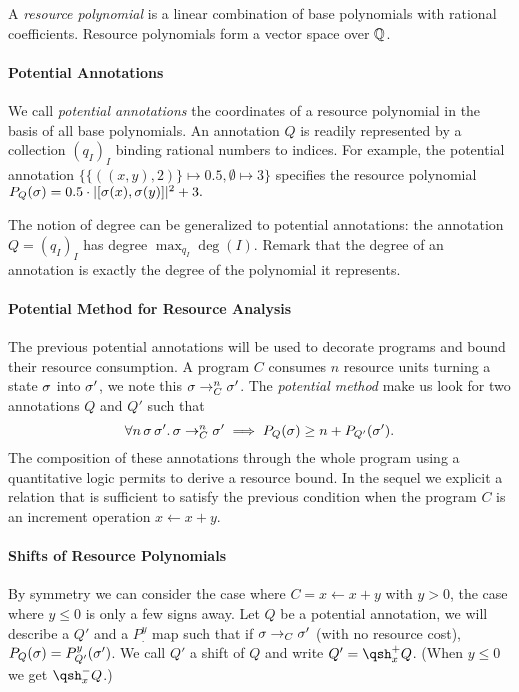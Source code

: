 \documentclass[nocopyrightspace,preprint]{sigplanconf-pldi15}
\begin{document}
A \emph{resource polynomial} is a linear combination of
base polynomials with rational coefficients.  Resource polynomials
form a vector space over $\mathbb{Q}$.

\paragraph{Potential Annotations}

We call \emph{potential annotations}
the coordinates of a resource polynomial in the basis of
all base polynomials.  An annotation $Q$ is readily represented
by a collection $(q_I)_I$ binding rational numbers to indices.
For example, the potential annotation $\{\{((x,y),2)\} \mapsto 0.5,
\emptyset \mapsto 3\}$ specifies the resource polynomial
$
  P_Q(\sigma) = 0.5\cdot|[\sigma(x),\sigma(y)]|^2 + 3.
$

The notion of degree can be generalized to potential annotations:
the annotation $Q = (q_I)_I$ has degree $\max_{q_I} \deg(I)$.
Remark that the degree of an annotation is exactly the degree of
the polynomial it represents.

\paragraph{Potential Method for Resource Analysis}

The previous potential annotations will be used to decorate
programs and bound their resource consumption.  A program
$C$ consumes $n$ resource units turning a state $\sigma$ into $\sigma'$,
we note this $\sigma \rightarrow^n_C \sigma'$.  The \emph{potential
method} make us look for two annotations $Q$ and $Q'$ such
that
$$
  \forall n\, \sigma\, \sigma'.\, \sigma \rightarrow^n_C \sigma'
    \implies P_Q(\sigma) \ge n + P_{Q'}(\sigma').
$$
The composition of these annotations through the whole program
using a quantitative logic permits to derive a resource bound.
In the sequel we explicit a relation that is sufficient to
satisfy the previous condition when the program $C$ is an
increment operation $x \gets x+y$.

\paragraph{Shifts of Resource Polynomials}

By symmetry we can consider the case where $C=x \gets x+y$ with
$y>0$, the case where $y \le 0$ is only a few signs away.  Let
$Q$ be a potential annotation, we will describe a $Q'$ and a
$P^y_.$ map such that if $\sigma \rightarrow_C \sigma'$ (with no resource cost),
$P_Q(\sigma) = P^y_{Q'}(\sigma')$.  We call $Q'$ a shift of $Q$ and
write $Q' = \qsh_x^+ Q$.  (When $y\le0$ we get $\qsh_x^-Q$.)
\end{document}
